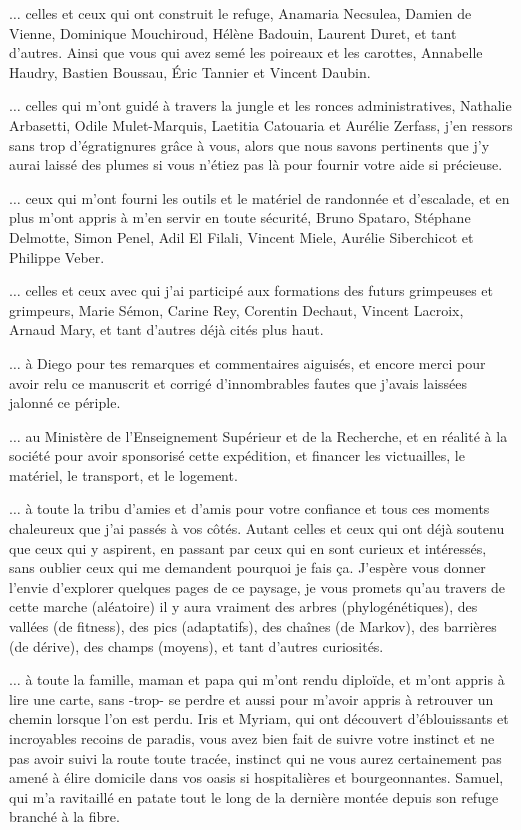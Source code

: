 $\hdots$ celles et ceux qui ont construit le refuge, Anamaria Necsulea, Damien de Vienne, Dominique Mouchiroud, Hélène Badouin, Laurent Duret, et tant d’autres.
Ainsi que vous qui avez semé les poireaux et les carottes, Annabelle Haudry, Bastien Boussau, Éric Tannier et Vincent Daubin.

$\hdots$ celles qui m’ont guidé à travers la jungle et les ronces administratives, Nathalie Arbasetti, Odile Mulet-Marquis, Laetitia Catouaria et Aurélie Zerfass, j’en ressors sans trop d’égratignures grâce à vous, alors que nous savons pertinents que j’y aurai laissé des plumes si vous n’étiez pas là pour fournir votre aide si précieuse.

$\hdots$ ceux qui m’ont fourni les outils et le matériel de randonnée et d’escalade, et en plus m’ont appris à m’en servir en toute sécurité, Bruno Spataro, Stéphane Delmotte, Simon Penel, Adil El Filali, Vincent Miele, Aurélie Siberchicot et Philippe Veber.

$\hdots$ celles et ceux avec qui j’ai participé aux formations des futurs grimpeuses et grimpeurs, Marie Sémon, Carine Rey, Corentin Dechaut, Vincent Lacroix, Arnaud Mary, et tant d’autres déjà cités plus haut.

$\hdots$ à Diego pour tes remarques et commentaires aiguisés, et encore merci pour avoir relu ce manuscrit et corrigé d’innombrables fautes que j'avais laissées jalonné ce périple.

$\hdots$ au Ministère de l’Enseignement Supérieur et de la Recherche, et en réalité à la société pour avoir sponsorisé cette expédition, et financer les victuailles, le matériel, le transport, et le logement.

$\hdots$ à toute la tribu d’amies et d’amis pour votre confiance et tous ces moments chaleureux que j’ai passés à vos côtés.
Autant celles et ceux qui ont déjà soutenu que ceux qui y aspirent, en passant par ceux qui en sont curieux et intéressés, sans oublier ceux qui me demandent pourquoi je fais ça.
J’espère vous donner l’envie d’explorer quelques pages de ce paysage, je vous promets qu’au travers de cette marche (aléatoire) il y aura vraiment des arbres (phylogénétiques), des vallées (de fitness), des pics (adaptatifs), des chaînes (de Markov), des barrières (de dérive), des champs (moyens), et tant d’autres curiosités.

$\hdots$ à toute la famille, maman et papa qui m’ont rendu diploïde, et m’ont appris à lire une carte, sans -trop- se perdre et aussi pour m’avoir appris à retrouver un chemin lorsque l'on est perdu.
Iris et Myriam, qui ont découvert d’éblouissants et incroyables recoins de paradis, vous avez bien fait de suivre votre instinct et ne pas avoir suivi la route toute tracée, instinct qui ne vous aurez certainement pas amené à élire domicile dans vos oasis si hospitalières et bourgeonnantes.
Samuel, qui m’a ravitaillé en patate tout le long de la dernière montée depuis son refuge branché à la fibre.

